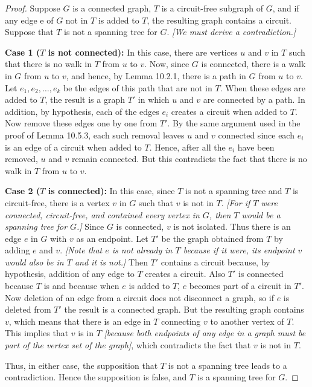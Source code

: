 \documentclass[14pt]{extarticle}
\begin{document}
\begin{proof}
Suppose \(G\) is a connected graph, \(T\) is a circuit-free subgraph of \(G\), and if any edge e of \(G\) not in \(T\) is 
added to \(T\), the resulting graph contains a circuit. Suppose that \(T\) is not a spanning tree for \(G\). 
{\it [We must derive a contradiction.]}

{\bf Case 1 (\(T\) is not connected):} In this case, there are vertices \(u\) and \(v\) in \(T\) such that there is no walk 
in \(T\) from \(u\) to \(v\). Now, since \(G\) is connected, there is a walk in \(G\) from \(u\) to \(v\), and hence, by 
Lemma 10.2.1, there is a path in \(G\) from \(u\) to \(v\). Let \(e_1, e_2, \ldots, e_k\) be the edges of this path that 
are not in \(T\). When these edges are added to \(T\), the result is a graph \(T'\) in which \(u\) and \(v\) are 
connected by a path. In addition, by hypothesis, each of the edges \(e_i\) creates a circuit when added to \(T\). Now 
remove these edges one by one from \(T'\). By the same argument used in the proof of Lemma 10.5.3, each such removal 
leaves \(u\) and \(v\) connected since each \(e_i\) is an edge of a circuit when added to \(T\). Hence, after all the \(e_i\) 
have been removed, \(u\) and \(v\) remain connected. But this contradicts the fact that there is no walk in \(T\) from 
\(u\) to \(v\).

{\bf Case 2 (\(T\) is connected):} In this case, since \(T\) is not a spanning tree and \(T\) is circuit-free, there is a 
vertex \(v\) in \(G\) such that \(v\) is not in \(T\). {\it [For if \(T\) were connected, circuit-free, and contained 
every vertex in \(G\), then \(T\) would be a spanning tree for \(G\).]} Since \(G\) is connected, \(v\) is not isolated. Thus 
there is an edge \(e\) in \(G\) with \(v\) as an endpoint. Let \(T'\)  be the graph obtained from \(T\) by adding \(e\) and 
\(v\). {\it [Note that \(e\) is not already in \(T\) because if it were, its endpoint \(v\) would also be in \(T\) and it 
is not.]} Then \(T'\) contains a circuit because, by hypothesis, addition of any edge to \(T\) creates a circuit. 
Also \(T'\) is connected because \(T\) is and because when \(e\) is added to \(T\), \(e\) becomes part of a circuit in 
\(T'\). Now deletion of an edge from a circuit does not disconnect a graph, so if \(e\) is deleted from \(T'\) the 
result is a connected graph. But the resulting graph contains \(v\), which means that there is an edge in \(T\) connecting 
\(v\) to another vertex of \(T\). This implies that \(v\) is in \(T\) {\it [because both endpoints of any edge in a graph 
must be part of the vertex set of the graph]}, which contradicts the fact that \(v\) is not in \(T\).

Thus, in either case, the supposition that \(T\) is not a spanning tree leads to a contradiction. Hence the supposition 
is false, and \(T\) is a spanning tree for \(G\).
\end{proof}
\end{document}
